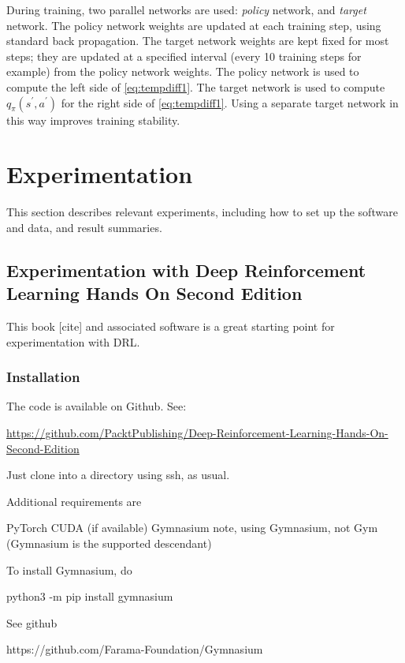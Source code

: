 \documentclass[acmlarge,screen]{acmart}
\begin{document}
During training, two parallel networks are used:  \textit{policy} network, and \textit{target} network.  
The policy network weights are updated at each training step, using standard back propagation.
The target network weights are kept fixed for most steps;  they are updated at a specified interval
(every 10 training steps for example) from the policy network weights.
The policy network is used to compute the left side of \ref{eq:tempdiff1}.  
The target network is used to compute $q_\pi (s^\prime, a^\prime)$ for the right side of \ref{eq:tempdiff1}.  
Using a separate target network in this way improves training stability.



\section{Experimentation}

This section describes relevant experiments, including how to set up the software and data, and result summaries.

\subsection{Experimentation with Deep Reinforcement Learning Hands On Second Edition}

This book [cite] and associated software is a great starting point for experimentation with DRL.

\subsubsection{Installation}

The code is available on Github.  See:

\noindent \url{https://github.com/PacktPublishing/Deep-Reinforcement-Learning-Hands-On-Second-Edition}

Just clone into a directory using ssh, as usual.

Additional requirements are

PyTorch
CUDA (if available)
Gymnasium
note, using Gymnasium, not Gym (Gymnasium is the supported descendant)

To install Gymnasium, do

python3 -m pip install gymnasium

See github

https://github.com/Farama-Foundation/Gymnasium
\end{document}
